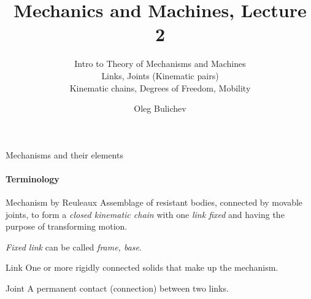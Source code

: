\documentclass[aspectratio=169]{beamer}
\title[MaM]{Mechanics and Machines, Lecture 2} %
\subtitle{Intro to Theory of Mechanisms and Machines
\\ Links, Joints (Kinematic pairs)     \\ Kinematic chains, Degrees of Freedom, Mobility  
         } %
\author{Oleg Bulichev}
\newcommand{\fbckg}[1]{\usebackgroundtemplate{\texttt{[image: \#1]}}}%
\begin{document}
\setlength{\abovedisplayskip}{0pt}
\setlength{\belowdisplayskip}{0pt}
\setlength{\abovedisplayshortskip}{0pt}
\setlength{\belowdisplayshortskip}{0pt}

\fbckg{fibeamer/figs/title_page.png}

\fbckg{fibeamer/figs/common.png}

\note{\scriptsize \begin{itemize}
        \item \
    \end{itemize}}

\begin{frame}[t]{Mechanisms and their elements}
    \framesubtitle{Terminology}
    \begin{exampleblock}{Mechanism by Reuleaux}
        Assemblage of resistant
        bodies, connected by movable joints, to form a \textit{closed kinematic chain} with one \textit{link fixed}
        and having the purpose of transforming motion.

        \textit{Fixed link} can be called \textit{frame, base}.
    \end{exampleblock}
    \begin{exampleblock}{Link}
        One or more rigidly connected solids that make up the mechanism.
    \end{exampleblock}
    \begin{exampleblock}{Joint}
        A permanent contact (connection) between two links.
    \end{exampleblock}
\end{frame}
\end{document}
